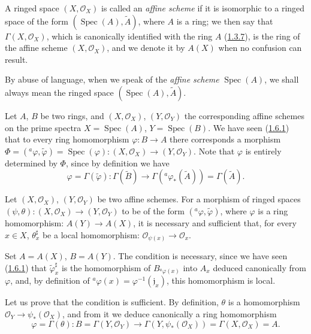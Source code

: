 \begin{definition}[1.7.1]
\label{I.1.7.1}
A ringed space $(X,\mathscr{O}_X)$ is called an \emph{affine scheme} if it
is isomorphic to a ringed space of the form
$(\operatorname{Spec}(A),\widetilde A)$, where $A$ is a ring; we then say
that $\Gamma(X,\mathscr{O}_X)$, which is canonically identified with the ring
$A$ (\hyperref[I.1.3.7]{1.3.7}), is the ring of the affine scheme
$(X,\mathscr{O}_X)$, and we denote it by $A(X)$ when no confusion can
result.
\end{definition}

By abuse of language, when we speak of the \emph{affine scheme}
$\operatorname{Spec}(A)$, we shall always mean the ringed space
$(\operatorname{Spec}(A),\widetilde A)$.

\begin{env}[1.7.2]
\label{I.1.7.2}
Let $A$, $B$ be two rings, and $(X,\mathscr{O}_X)$,
$(Y,\mathscr{O}_Y)$ the corresponding affine schemes on the prime
spectra $X=\operatorname{Spec}(A)$, $Y=\operatorname{Spec}(B)$. We have
seen (\hyperref[I.1.6.1]{1.6.1}) that to every ring homomorphism
$\varphi:B\to A$ there corresponds a morphism
$\Phi=({}^a\varphi,\widetilde\varphi)=\operatorname{Spec}(\varphi):
(X,\mathscr{O}_X)\to(Y,\mathscr{O}_Y)$. Note that $\varphi$ is
entirely determined by $\Phi$, since by definition we have
\[
  \varphi=\Gamma(\widetilde\varphi):
  \Gamma(\widetilde B)\longrightarrow
  \Gamma({}^a\varphi_*(\widetilde A))=\Gamma(\widetilde A).
\]
\end{env}

\begin{theorem}[1.7.3]
\label{I.1.7.3}
Let $(X,\mathscr{O}_X)$, $(Y,\mathscr{O}_Y)$ be two affine schemes. For a
morphism of ringed spaces
$(\psi,\theta):(X,\mathscr{O}_X)\to(Y,\mathscr{O}_Y)$ to be of the form
$({}^a\varphi,\widetilde\varphi)$, where $\varphi$ is a ring homomorphism:
$A(Y)\to A(X)$, it is necessary and sufficient that, for every $x\in X$,
$\theta_x^{\sharp}$ be a \textup{local} homomorphism:
$\mathscr{O}_{\psi(x)}\to\mathscr{O}_x$.
\end{theorem}

Set $A=A(X)$, $B=A(Y)$. The condition is necessary, since we have seen
(\hyperref[I.1.6.1]{1.6.1}) that $\widetilde\varphi_x^{\sharp}$ is
the homomorphism of $B_{{}^a\varphi(x)}$ into $A_x$ deduced canonically from
$\varphi$, and, by definition of
${}^a\varphi(x)=\varphi^{-1}(\mathfrak{j}_x)$, this homomorphism is local.

Let us prove that the condition is sufficient. By definition, $\theta$ is a
homomorphism $\mathscr{O}_Y\to\psi_*(\mathscr{O}_X)$, and from it we deduce
canonically a ring homomorphism
\[
  \varphi=\Gamma(\theta):
  B=\Gamma(Y,\mathscr{O}_Y)
  \longrightarrow
  \Gamma(Y,\psi_*(\mathscr{O}_X))=\Gamma(X,\mathscr{O}_X)=A.
\]


